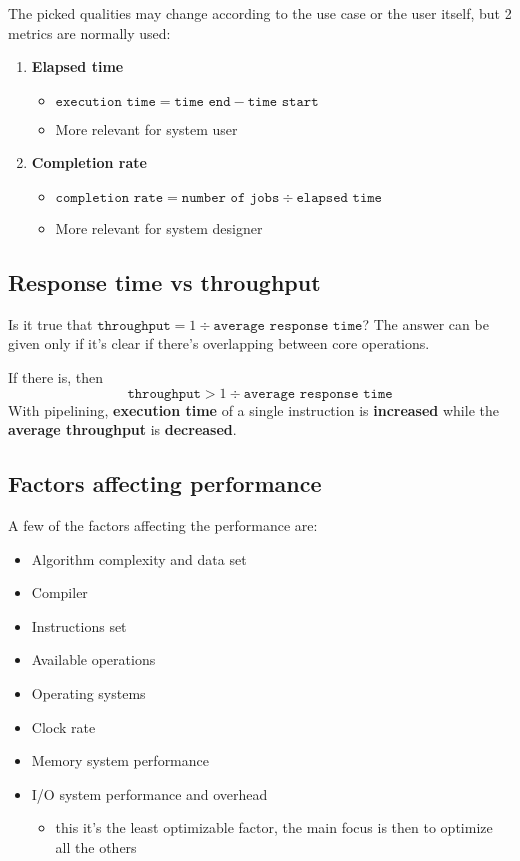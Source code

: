 \documentclass[english]{article}
\begin{document}
The picked qualities may change according to the use case or the user itself,
but 2 metrics are normally used:

\begin{enumerate}
  \item \textbf{Elapsed time}
  \begin{itemize}
    \item \(\texttt{execution time} = \texttt{time end} - \texttt{time start}\)
    \item More relevant for system user
  \end{itemize}
  \item \textbf{Completion rate}
  \begin{itemize}
    \item \(\texttt{completion rate} = \texttt{number of jobs} \div \texttt{elapsed time}\)
    \item More relevant for system designer
  \end{itemize}
\end{enumerate}

\subsection{Response time vs throughput}

Is it true that
\(\texttt{throughput} = {1} \div { \texttt{average response time}}\)?
The answer can be given only if it's clear if there's overlapping between core operations.

If there is, then \[ \texttt{throughput} > {1} \div {\texttt{average response time}} \]
With pipelining, \textbf{execution time} of a single instruction is \textbf{increased} while the \textbf{average throughput} is \textbf{decreased}.

\subsection{Factors affecting performance}

A few of the factors affecting the performance are:

\begin{itemize}
  \item Algorithm complexity and data set
  \item Compiler
  \item Instructions set
  \item Available operations
  \item Operating systems
  \item Clock rate
  \item Memory system performance
  \item I/O system performance and overhead
        \begin{itemize}
          \item this it's the least optimizable factor, the main focus is then to optimize all the others
        \end{itemize}
\end{itemize}
\end{document}
